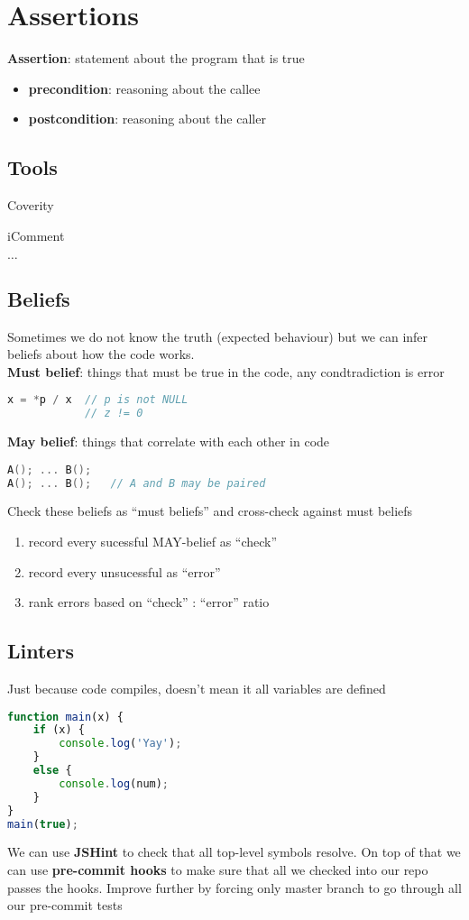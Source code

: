\documentclass[]{article}
\theoremstyle{definition}
\begin{document}
	\section{Assertions}
		\textbf{Assertion}: statement about the program that is true
		\begin{itemize}
			\item \textbf{precondition}: reasoning about the callee
			\item \textbf{postcondition}: reasoning about the caller
		\end{itemize}
		\subsection{Tools}
			\begin{description}
				\item Coverity
				\item iComment
				\item $\dots$
			\end{description}
		\subsection{Beliefs}
			Sometimes we do not know the truth (expected behaviour) but we can infer beliefs about how the code works. \\ 
			\newline
			\textbf{Must belief}: things that must be true in the code, any condtradiction is error
			\begin{lstlisting}[language=C]
x = *p / x	// p is not NULL
			// z != 0
			\end{lstlisting}
			\textbf{May belief}: things that correlate with each other in code
			\begin{lstlisting}[language=C]
A(); ... B();
A(); ... B();	// A and B may be paired
			\end{lstlisting}
			Check these beliefs as ``must beliefs'' and cross-check against must beliefs
			\begin{enumerate}
				\item record every sucessful MAY-belief as ``check''
				\item record every unsucessful as ``error''
				\item rank errors based on ``check'' : ``error'' ratio
			\end{enumerate}
		\subsection{Linters}
			Just because code compiles, doesn't mean it all variables are defined
			\begin{lstlisting}[language=Javascript]
function main(x) {
	if (x) {
		console.log('Yay');
	}
	else {
		console.log(num);
	}
}
main(true);
			\end{lstlisting}
			We can use \textbf{JSHint} to check that all top-level symbols resolve. On top of that we can use \textbf{pre-commit hooks} to make sure that all we checked into our repo passes the hooks. Improve further by forcing only master branch to go through all our pre-commit tests
\end{document}
